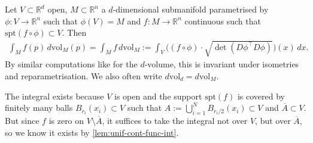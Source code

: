 \begin{definition}\label{def:int-subm}
	Let $V \subset \mathbb{R}^{d}$ open, $M \subset \mathbb{R}^{n}$ a $d$-dimensional submanifold parametrised by $\phi: V \to \mathbb{R}^{n}$ such that $\phi(V) = M$ and $f: M \to \mathbb{R}^{n}$ continuous such that $\text{spt}(f \circ \phi) \subset V$. Then
	\begin{align*}
		\int_{M} f(p) \, d \text{vol}_{M}(p) = \int_{M} f \, d \text{vol}_{M} := \int_{V} \Big((f \circ \phi) \cdot \sqrt{\det (D\phi^\top D\phi)}\Big)(x) \, dx.
	\end{align*}
	By similar computations like for the $d$-volume, this is invariant under isometries and reparametrisation. We also often write $d \text{vol}_{d} = d \text{vol}_{M}$.
\end{definition}

\begin{remark}\label{rem:compact-inside-open}
	The integral exists because $V$ is open and the support $\text{spt}(f)$ is covered by finitely many balls $B_{r_{i}}(x_{i}) \subset V$ such that $A := \bigcup_{i = 1}^{N} B_{r_{i} / 2}(x_{i}) \subset V$ and $\overline{ A } \subset V$. But since $f$ is zero on $V \setminus \overline{ A } $, it suffices to take the integral not over $V$, but over $\overline{ A } $, so we know it exists by \ref{lem:unif-cont-func-int}.	
\end{remark}

